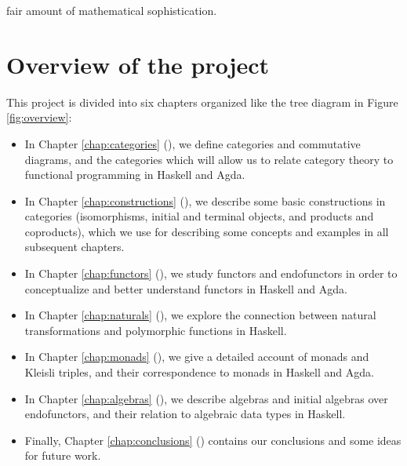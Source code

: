 

fair amount of mathematical sophistication.

\section*{Overview of the project}
\label{sec:introduction-overview}

This project is divided into six chapters organized like the tree
diagram in Figure \ref{fig:overview}:
\begin{itemize}
\item
  In Chapter \ref{chap:categories} (), we
  define categories and commutative diagrams, and the categories which
  will allow us to relate category theory to functional programming in
  Haskell and Agda.

\item
  In Chapter \ref{chap:constructions} (),
  we describe some basic constructions in categories (isomorphisms,
  initial and terminal objects, and products and coproducts), which we
  use for describing some concepts and examples in all subsequent
  chapters.

\item
  In Chapter \ref{chap:functors} (), we study
  functors and endofunctors in order to conceptualize and better
  understand functors in Haskell and Agda.

\item
  In Chapter \ref{chap:naturals} (), we explore
  the connection between natural transformations and polymorphic
  functions in Haskell.

\item
  In Chapter \ref{chap:monads} (), we give a
  detailed account of monads and Kleisli triples, and their
  correspondence to monads in Haskell and Agda.

\item
  In Chapter \ref{chap:algebras} (), we
  describe algebras and initial algebras over endofunctors, and their
  relation to algebraic data types in Haskell.

\item
  Finally, Chapter \ref{chap:conclusions} ()
  contains our conclusions and some ideas for future work.

\end{itemize}

